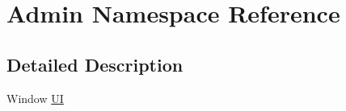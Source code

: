 \hypertarget{namespace_admin}{}\section{Admin Namespace Reference}
\label{namespace_admin}


\subsection{Detailed Description}
Window \hyperlink{namespace_u_i}{UI} 